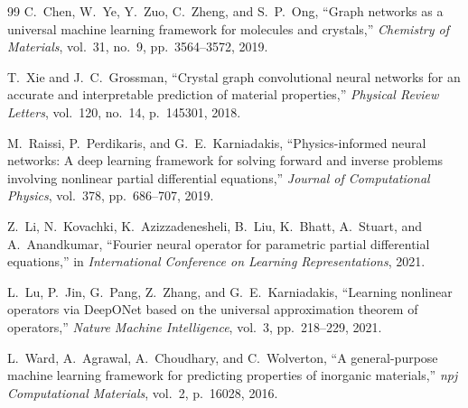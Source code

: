 \documentclass[11pt,a4paper]{article}
\begin{document}
\begin{thebibliography}{99}
C.~Chen, W.~Ye, Y.~Zuo, C.~Zheng, and S.~P.~Ong,
``Graph networks as a universal machine learning framework for molecules and crystals,'' \emph{Chemistry of Materials}, vol.~31, no.~9, pp.~3564--3572, 2019.

T.~Xie and J.~C.~Grossman,
``Crystal graph convolutional neural networks for an accurate and interpretable prediction of material properties,'' \emph{Physical Review Letters}, vol.~120, no.~14, p.~145301, 2018.

M.~Raissi, P.~Perdikaris, and G.~E.~Karniadakis,
``Physics-informed neural networks: A deep learning framework for solving forward and inverse problems involving nonlinear partial differential equations,'' \emph{Journal of Computational Physics}, vol.~378, pp.~686--707, 2019.

Z.~Li, N.~Kovachki, K.~Azizzadenesheli, B.~Liu, K.~Bhatt, A.~Stuart, and A.~Anandkumar,
``Fourier neural operator for parametric partial differential equations,'' in \emph{International Conference on Learning Representations}, 2021.

L.~Lu, P.~Jin, G.~Pang, Z.~Zhang, and G.~E.~Karniadakis,
``Learning nonlinear operators via DeepONet based on the universal approximation theorem of operators,'' \emph{Nature Machine Intelligence}, vol.~3, pp.~218--229, 2021.

L.~Ward, A.~Agrawal, A.~Choudhary, and C.~Wolverton,
``A general-purpose machine learning framework for predicting properties of inorganic materials,'' \emph{npj Computational Materials}, vol.~2, p.~16028, 2016.

\end{thebibliography}
\end{document}
